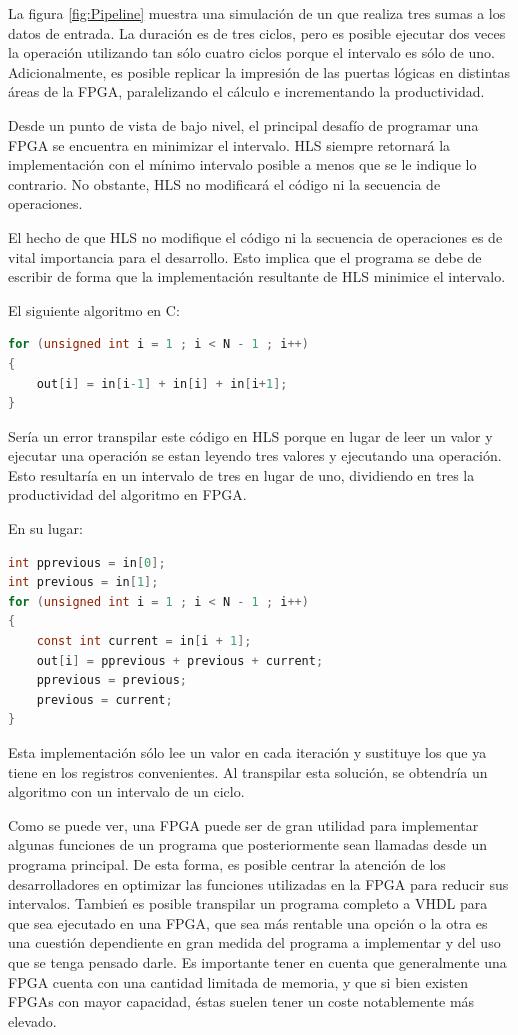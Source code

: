La figura \ref{fig:Pipeline} muestra una simulación de un 
que realiza tres sumas a los datos de entrada.
La duración es de tres ciclos, pero es posible ejecutar dos veces la operación
utilizando tan sólo cuatro ciclos porque el intervalo es sólo de uno.
Adicionalmente, es posible replicar la impresión de las puertas lógicas
en distintas áreas de la FPGA, paralelizando el cálculo e incrementando la productividad.

Desde un punto de vista de bajo nivel, el principal desafío de programar una FPGA
se encuentra en minimizar el intervalo.
HLS siempre retornará la implementación con el mínimo intervalo posible a menos que se le indique lo contrario.
No obstante, HLS no modificará el código ni la secuencia de operaciones.

El hecho de que HLS no modifique el código ni la secuencia de operaciones es de vital importancia
para el desarrollo.
Esto implica que el programa se debe de escribir de forma que la implementación
resultante de HLS minimice el intervalo.

\begin{examplebox}
    El siguiente algoritmo en C:
    \begin{lstlisting}[language=C]
for (unsigned int i = 1 ; i < N - 1 ; i++)
{
    out[i] = in[i-1] + in[i] + in[i+1];
}
    \end{lstlisting}
    Sería un error transpilar este código en HLS
    porque en lugar de leer un valor y ejecutar una operación
    se estan leyendo tres valores y ejecutando una operación.
    Esto resultaría en un intervalo de tres en lugar de uno,
    dividiendo en tres la productividad del algoritmo en FPGA.

    En su lugar:
    \begin{lstlisting}[language=C]
int pprevious = in[0];
int previous = in[1];
for (unsigned int i = 1 ; i < N - 1 ; i++)
{
    const int current = in[i + 1];
    out[i] = pprevious + previous + current;
    pprevious = previous;
    previous = current;
}
    \end{lstlisting}
    Esta implementación sólo lee un valor en cada iteración
    y sustituye los que ya tiene en los registros convenientes.
    Al transpilar esta solución, se obtendría un algoritmo
    con un intervalo de un ciclo.
\end{examplebox}

Como se puede ver, una FPGA puede ser de gran utilidad para
implementar algunas funciones de un programa que posteriormente
sean llamadas desde un programa principal.
De esta forma, es posible centrar la atención de los desarrolladores
en optimizar las funciones utilizadas en la FPGA para reducir sus
intervalos.
Tambień es posible transpilar un programa completo a VHDL
para que sea ejecutado en una FPGA,
que sea más rentable una opción o la otra
es una cuestión dependiente en gran medida
del programa a implementar y del uso que se tenga pensado darle.
Es importante tener en cuenta que generalmente una FPGA cuenta con una
cantidad limitada de memoria, y que si bien existen FPGAs con mayor capacidad,
éstas suelen tener un coste notablemente más elevado.

